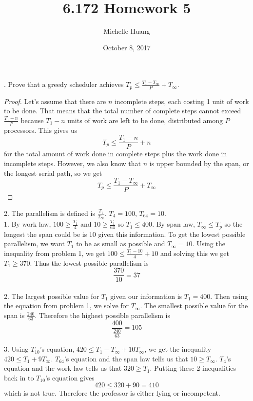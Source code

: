 \documentclass{article}
\title{6.172 Homework 5}
\author{Michelle Huang}
\date{October 8, 2017}
\begin{document}
. Prove that a greedy scheduler achieves $T_p \leq \frac{T_1 - T_\infty}{P} + T_\infty$.
\begin{proof}
    Let's assume that there are $n$ incomplete steps, each costing 1 unit of work to be done. That means that the total number of complete steps cannot exceed $\frac{T_1 - n}{P}$ because $T_1 - n$ units of work are left to be done, distributed among $P$ processors. This gives us
    $$T_p \leq \frac{T_1 - n}{P} + n$$
    for the total amount of work done in complete steps plus the work done in incomplete steps. However, we also know that $n$ is upper bounded by the span, or the longest serial path, so we get
    $$T_p \leq \frac{T_1 - T_\infty}{P} + T_\infty$$
\end{proof}

2. The parallelism is defined is $\frac{T_1}{T_\infty}$. $T_{4} = 100$, $T_{64} = 10$.
\\1. By work law, $100 \geq \frac{T_1}{4}$ and $10 \geq \frac{T_1}{64}$ so $T_1 \leq 400$.
By span law, $T_{\infty} \leq T_p$ so the longest the span could be is $10$ given this information. To get the lowest possible parallelism, we want $T_1$ to be as small as possible and $T_{\infty} = 10$. Using the inequality from problem 1, we get $100 \leq \frac{T_1 - 10}{4} + 10$ and solving this we get $T_1 \geq 370$. Thus the lowest possible parallelism is
$$\frac{370}{10} = 37$$
\\2. The largest possible value for $T_1$ given our information is $T_1 = 400$. Then using the equation from problem 1, we solve for $T_{\infty}$. The smallest possible value for the span is $\frac{240}{63}$. Therefore the highest possible parallelism is
$$\frac{400}{\frac{240}{63}} = 105$$

3. Using $T_{10}$'s equation, $420 \leq T_1 - T_\infty + 10T_\infty$, we get the inequality $420 \leq T_1 + 9T_\infty$. $T_{64}$'s equation and the span law tells us that $10 \geq T_\infty$. $T_4$'s equation and the work law tells us that $320 \geq T_1$. Putting these 2 inequalities back in to $T_{10}$'s equation gives
$$420 \leq 320 + 90 = 410$$
which is not true. Therefore the professor is either lying or incompetent.
\end{document}
